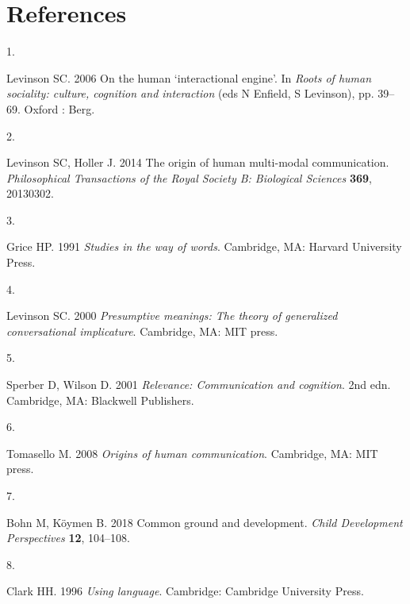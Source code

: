 \documentclass[
  man,floatsintext]{apa6}
\newlength{\cslhangindent}
\newlength{\csllabelwidth}
\newlength{\cslentryspacingunit} %
\newenvironment{CSLReferences}[2] %
 {%
  \setlength{\parindent}{0pt}
  \ifodd #1
  \let\oldpar\par
  \def\par{\hangindent=\cslhangindent\oldpar}
  \fi
  \setlength{\parskip}{#2\cslentryspacingunit}
 }%
 {}
\newcommand{\CSLLeftMargin}[1]{\parbox[t]{\csllabelwidth}{#1}}
\newcommand{\CSLRightInline}[1]{\parbox[t]{\linewidth - \csllabelwidth}{#1}\break}
\begin{document}
\newpage

\hypertarget{references}{%
\section{References}\label{references}}

\begingroup
\setlength{\parindent}{-0.5in}
\setlength{\leftskip}{0.5in}

\hypertarget{refs}{}
\begin{CSLReferences}{0}{0}
\leavevmode{}%
\CSLLeftMargin{1. }
\CSLRightInline{Levinson SC. 2006 On the human {`interactional engine'}. In \emph{Roots of human sociality: culture, cognition and interaction} (eds N Enfield, S Levinson), pp. 39--69. Oxford : Berg. }

\leavevmode{}%
\CSLLeftMargin{2. }
\CSLRightInline{Levinson SC, Holler J. 2014 The origin of human multi-modal communication. \emph{Philosophical Transactions of the Royal Society B: Biological Sciences} \textbf{369}, 20130302.}

\leavevmode{}%
\CSLLeftMargin{3. }
\CSLRightInline{Grice HP. 1991 \emph{Studies in the way of words}. Cambridge, MA: Harvard University Press. }

\leavevmode{}%
\CSLLeftMargin{4. }
\CSLRightInline{Levinson SC. 2000 \emph{Presumptive meanings: The theory of generalized conversational implicature}. Cambridge, MA: MIT press. }

\leavevmode{}%
\CSLLeftMargin{5. }
\CSLRightInline{Sperber D, Wilson D. 2001 \emph{Relevance: Communication and cognition}. 2nd edn. Cambridge, MA: Blackwell Publishers. }

\leavevmode{}%
\CSLLeftMargin{6. }
\CSLRightInline{Tomasello M. 2008 \emph{Origins of human communication}. Cambridge, MA: MIT press. }

\leavevmode{}%
\CSLLeftMargin{7. }
\CSLRightInline{Bohn M, Köymen B. 2018 Common ground and development. \emph{Child Development Perspectives} \textbf{12}, 104--108.}

\leavevmode{}%
\CSLLeftMargin{8. }
\CSLRightInline{Clark HH. 1996 \emph{Using language}. Cambridge: Cambridge University Press. }


\end{CSLReferences}
\end{document}
